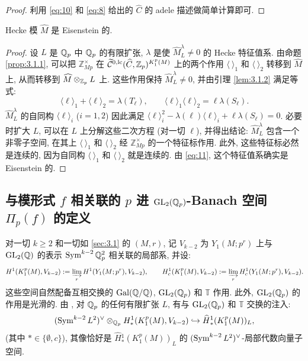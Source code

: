 \begin{proof}
利用 \eqref{eq:10} 和 \eqref{eq:8} 给出的 $\widehat{C}$ 的 adele 描述做简单计算即可.
\end{proof}

\begin{corollary}\label{cor:3.1.3}
Hecke 模 $\widehat{M}$ 是 Eisenstein 的.
\end{corollary}

\begin{proof}
设 $L$ 是 $\mathbb{Q}_p$ 中 $\mathbb{Q}_p$ 的有限扩张, $\lambda$ 是使 $\widehat{M}_L^{\lambda} \neq 0$ 的 Hecke 特征值系.
由命题 \ref{prop:3.1.1}, 可以把 $\mathbb{Z}_{Mp}^{\times}$ 在 $\widetilde{\mathcal{C}}{}^{0,\mathrm{lc}}(\widehat{C},\mathbb{Z}_p)^{K_1^{p}(M)}$ 上的两个作用 $\langle\ \rangle_1$ 和 $\langle\ \rangle_2$ 转移到 $\widehat{M}$ 上, 从而转移到 $\widehat{M} \otimes_{\mathbb{Z}_p} L$ 上.
这些作用保持 $\widehat{M}_L^{\lambda} \neq 0$, 并由引理 \ref{lem:3.1.2} 满足等式:
\begin{equation}
\label{eq:11}
\langle \ell \rangle_1 + \langle \ell \rangle_2 = \lambda(T_{\ell}), \qquad \langle \ell \rangle_1\langle \ell \rangle_2 = \ell\lambda(S_{\ell}).
\end{equation}
$\widehat{M}_L^{\lambda}$ 的自同构 $\langle \ell \rangle_i$ ($i = 1,2$) 因此满足 $\langle \ell \rangle_i^{2} - \lambda(\ell)\langle \ell \rangle_i + \ell\lambda(S_{\ell}) = 0$.
必要时扩大 $L$, 可以在 $L$ 上分解这些二次方程 (对一切 $\ell$), 并得出结论: $\widehat{M}_L^{\lambda}$ 包含一个非零子空间, 在其上 $\langle\ \rangle_1$ 和 $\langle\ \rangle_2$ 经 $\mathbb{Z}_{Mp}^{\times}$ 的一个特征标作用.
此外, 这些特征标必然是连续的, 因为自同构 $\langle\ \rangle_1$ 和 $\langle\ \rangle_2$ 就是连续的.
由 \eqref{eq:11}, 这个特征值系确实是 Eisenstein 的.
\end{proof}

\subsection{与模形式 $f$ 相关联的 $p$ 进 $\mathrm{GL}_2(\mathbb{Q}_p)$-Banach 空间 $\Pi_p(f)$ 的定义}\label{sec:3.2}

对一切 $k \ge 2$ 和一切如 \ref{sec:3.1} 的 $(M,r)$, 记 $V_{k-2}$ 为 $Y_1(M;p^{r})$ 上与 $\mathrm{GL}_2(\mathbb{Q})$ 的表示 $\operatorname{Sym}^{k-2}\mathbb{Q}_p^{2}$ 相关联的局部系, 并设:
\[
H^{1}(K_1^{p}(M),V_{k-2}) := \varinjlim_r H^{1}(Y_1(M;p^{r}),V_{k-2}), \qquad
H_{c}^{1}(K_1^{p}(M),V_{k-2}) := \varinjlim_r H_{c}^{1}(Y_1(M;p^{r}),V_{k-2}).
\]
这些空间自然配备互相交换的 $\operatorname{Gal}(\mathbb{Q}/\mathbb{Q})$, $\mathrm{GL}_2(\mathbb{Q}_p)$ 和 $\mathbb{T}$ 作用.
此外, $\mathrm{GL}_2(\mathbb{Q}_p)$ 的作用是光滑的.
由 \cite[\S4.3]{ref:24}, 对 $\mathbb{Q}_p$ 的任何有限扩张 $L$, 有与 $\mathrm{GL}_2(\mathbb{Q}_p)$ 和 $\mathbb{T}$ 交换的注入:
\begin{equation}
\label{eq:12}
(\operatorname{Sym}^{k-2}L^{2})^{\vee} \otimes_{\mathbb{Q}_p} H_{*}^{1}(K_1^{p}(M),V_{k-2}) \hookrightarrow \widehat{H}{}_{*}^{1}(K_1^{p}(M))_L,
\end{equation}
(其中 $* \in \{\emptyset,c\}$), 其像恰好是 $\widehat{H}{}_{*}^{1}(K_1^{p}(M))_L$ 的 $(\operatorname{Sym}^{k-2}L^{2})^{\vee}$-局部代数向量子空间.

